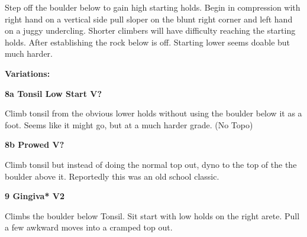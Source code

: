 \begin{multicols}{2}
\begin{minipage}{\linewidth}
					\begin{adjustwidth}{0.5cm}{}				
					Step off the boulder below to gain high starting holds. Begin in compression with right hand on a vertical side pull sloper on the blunt right corner and left hand on a juggy undercling.  Shorter climbers will have difficulty reaching the starting holds. After establishing the rock below is off. Starting lower seems doable but much harder.
					\end{adjustwidth}
					\end{minipage}
						\begin{adjustwidth}{0.5cm}{}				
						\textbf{Variations:} \newline
							\begin{minipage}{\linewidth}	
							\label{vr:Tonsil Low Start}
\colorbox{black!20}{
\parbox{0.95\textwidth}{
\textbf{
8a Tonsil Low Start V?  
}
}
}

							\begin{adjustwidth}{0.5cm}{}				
							Climb tonsil from the obvious lower holds without using the boulder below it as a foot. Seems like it might go, but at a much harder grade.
								\newline (No Topo) 
							\end{adjustwidth}
							\end{minipage}
							\begin{minipage}{\linewidth}	
							\label{vr:Prowed}
\colorbox{black!20}{
\parbox{0.95\textwidth}{
\textbf{
8b Prowed V?  
}
}
}

							\begin{adjustwidth}{0.5cm}{}				
							Climb tonsil but instead of doing the normal top out, dyno to the top of the the boulder above it. Reportedly this was an old school classic.
							\end{adjustwidth}
							\end{minipage}
						\end{adjustwidth}
					\begin{minipage}{\linewidth}	
					\label{rt:Gingiva}
\colorbox{green!20}{
\parbox{0.95\textwidth}{
\textbf{
9 Gingiva* V2   
}
}
}

					\begin{adjustwidth}{0.5cm}{}				
					Climbs the boulder below Tonsil. Sit start with low holds on the right arete. Pull a few awkward moves into a cramped top out.
					\end{adjustwidth}
					\end{minipage}
			\begin{minipage}{\columnwidth}

\end{minipage}
\end{multicols}
